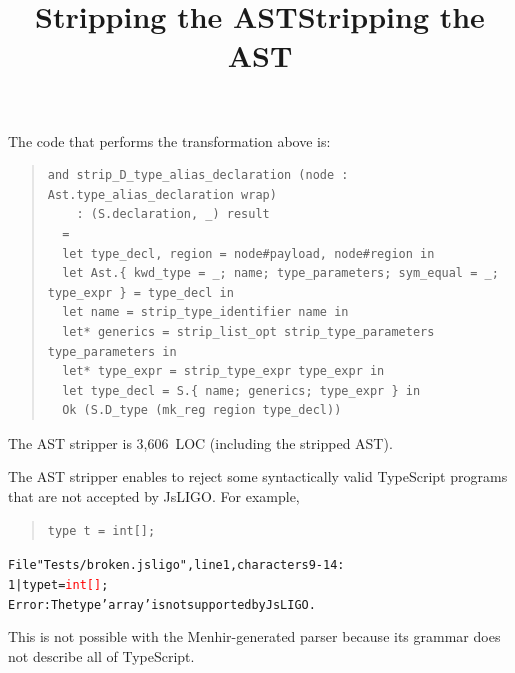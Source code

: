 \documentclass[wide]{slides}
\newcommand{\JsLIGO}[0]{\textsf{JsLIGO}}
\newcommand{\Menhir}[0]{\textsf{Menhir}}
\newcommand{\TypeScript}[0]{\textsf{TypeScript}}
\begin{document}
\begin{slide}
  \title{Stripping the AST}

  The code that performs the transformation above is:
  \begin{quote}
    \small
    \begin{lstlisting}[language=caml]
and strip_D_type_alias_declaration (node : Ast.type_alias_declaration wrap)
    : (S.declaration, _) result
  =
  let type_decl, region = node#payload, node#region in
  let Ast.{ kwd_type = _; name; type_parameters; sym_equal = _; type_expr } = type_decl in
  let name = strip_type_identifier name in
  let* generics = strip_list_opt strip_type_parameters type_parameters in
  let* type_expr = strip_type_expr type_expr in
  let type_decl = S.{ name; generics; type_expr } in
  Ok (S.D_type (mk_reg region type_decl))
    \end{lstlisting}
  \end{quote}

  The AST stripper is 3,606~LOC (including the stripped AST).

\end{slide}

\begin{slide}
  \title{Stripping the AST}

  The AST stripper enables to reject some syntactically valid
  \TypeScript{} programs that are not accepted by \JsLIGO{}. For
  example,
  \begin{quote}
    \begin{lstlisting}
type t = int[];
    \end{lstlisting}
  \end{quote}

  \begin{alltt}
    \small
File "Tests/broken.jsligo", line 1, characters 9-14:
  1 | type t = \textcolor{red}{int[]};
Error: The type 'array' is not supported by JsLIGO.
  \end{alltt}

  This is not possible with the \Menhir\hyp{}generated parser because
  its grammar does not describe all of \TypeScript{}.

\end{slide}
\end{document}
